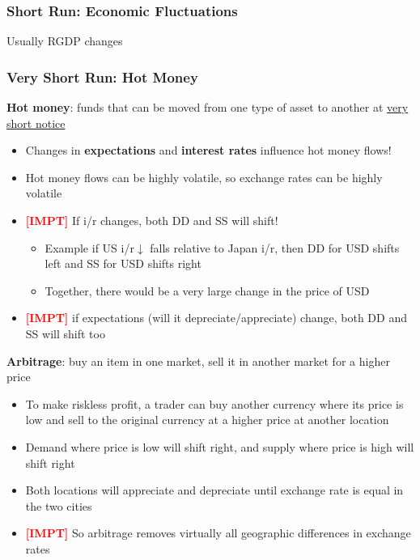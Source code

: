 \documentclass{article}
\newcommand{\impt}[0]{\textcolor{red}{\textbf{[IMPT] }}}
\begin{document}
\begin{multicols}{2}
\subsubsection{Short Run: Economic Fluctuations}
Usually RGDP changes
\subsubsection{Very Short Run: Hot Money}
\textbf{Hot money}: funds that can be moved from one type of asset to another at \underline{very short notice}
\begin{itemize}
	\item Changes in \textbf{expectations} and \textbf{interest rates} influence hot money flows!
	\item Hot money flows can be highly volatile, so exchange rates can be highly volatile
	\item \impt If i/r changes, both DD and SS will shift!
	\begin{itemize}
		\item Example if US i/r$\downarrow$ falls relative to Japan i/r, then DD for USD shifts left and SS for USD shifts right
		\item Together, there would be a very large change in the price of USD
	\end{itemize}
    \item \impt if expectations (will it depreciate/appreciate) change, both DD and SS will shift too
\end{itemize}
\textbf{Arbitrage}: buy an item in one market, sell it in another market for a higher price
\begin{itemize}
	\item To make riskless profit, a trader can buy another currency where its price is low and sell to the original currency at a higher price at another location
	\item Demand where price is low will shift right, and supply where price is high will shift right
	\item Both locations will appreciate and depreciate until exchange rate is equal in the two cities
	\item \impt So arbitrage removes virtually all geographic differences in exchange rates
\end{itemize}

\end{multicols}
\end{document}
